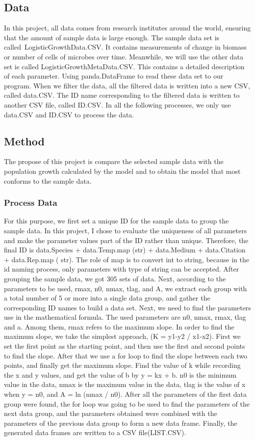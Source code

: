 \documentclass[11pt,a4 paper,title page]{article}
\begin{document}
    
    
    
    \subsection{Data}
    In this project, all data comes from research institutes around the world, ensuring that the amount of sample data is large enough. The sample data set is called LogisticGrowthData.CSV. It contains measurements of change in biomass or number of cells of microbes over time. Meanwhile, we will use the other data set is called LogisticGrowthMetaData.CSV. This contains a detailed description of each parameter.
Using panda.DataFrame to read these data set to our program. When we filter the data, all the filtered data is written into a new CSV, called data.CSV. The ID name corresponding to the filtered data is written to another CSV file, called ID.CSV. In all the following processes, we only use data.CSV and ID.CSV to process the data.

    \subsection{Method}
The propose of this project is compare the selected sample data with the population growth calculated by the model and to obtain the model that most conforms to the sample data. 
    \hfill\break
    \subsubsection{Process Data}
    For this purpose, we first set a unique ID for the sample data to group the sample data. In this project, I chose to evaluate the uniqueness of all parameters and make the parameter values part of the ID rather than unique. Therefore, the final ID is data.Species + data.Temp.map (str) + data.Medium +  data.Citation + data.Rep.map ( str). The role of map is to convert int to string, because in the id naming process, only parameters with type of string can be accepted. After grouping the sample data, we got 305 sets of data. Next, according to the parameters to be used, rmax, n0, nmax, tlag, and A, we extract each group with a total number of 5 or more into a single data group, and gather the corresponding ID names to build a data set. Next, we need to find the parameters use in the mathematical formula. The used parameters are n0, nmax, rmax, tlag and a. Among them, rmax refers to the maximum slope. In order to find the maximum slope, we take the simplest approach, (K = y1-y2 / x1-x2). First we set the first point as the starting point, and then use the first and second points to find the slope. After that we  use a for loop to find the slope between each two points, and finally get the maximum slope. Find the value of k while recording the x and y values, and get the value of b by y = kx + b. n0 is the minimum value in the data, nmax is the maximum value in the data, tlag is the value of x when y = n0, and A = ln (nmax / n0). After all the parameters of the first data group were found, the for loop was going to be used to find the parameters of the next data group, and the parameters obtained were combined with the parameters of the previous data group to form a new data frame. Finally, the generated data frames are written to a CSV file(LIST.CSV).
    \hfill\break
\end{document}
